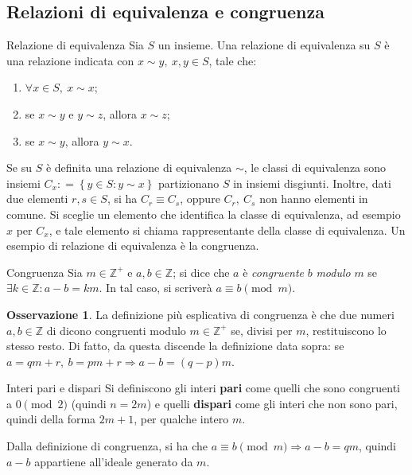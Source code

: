\documentclass[11pt, a4paper]{scrartcl}
\theoremstyle{definition}
\numberwithin{esempio}{section}
\theoremstyle{definition}
\newtheorem{obs}{Osservazione}
\numberwithin{obs}{section}
\numberwithin{nota}{section}
\numberwithin{equation}{subsection}
\begin{document}
\subsection{Relazioni di equivalenza e congruenza}
\begin{definizione}
	{Relazione di equivalenza}{}
	Sia $S$ un insieme.
	Una relazione di equivalenza su $S$ \`e una relazione indicata con $x \sim y, \ x, y \in S$, tale che:
	\begin{enumerate}[ER 1.]
		\item $\forall x \in S, \ x \sim x$;
		\item se $x \sim y$ e $y\sim z$, allora $x \sim z$;
		\item se $x\sim y$, allora $y \sim x$.
	\end{enumerate}
\end{definizione}
\noindent Se su $S$ \`e definita una relazione di equivalenza $\sim$, le classi di equivalenza sono insiemi $C_x : = \left\{ y \in S : y \sim x \right\} $ partizionano $S$ in insiemi disgiunti. 
Inoltre, dati due elementi $r,s \in S$, si ha $C_r \equiv C_s$, oppure $C_r,\ C_s$ non hanno elementi in comune.
Si sceglie un elemento che identifica la classe di equivalenza, ad esempio $x$ per $C_x$, e tale elemento si chiama rappresentante della classe di equivalenza. 
Un esempio di relazione di equivalenza \`e la congruenza.
\begin{definizione}
	{Congruenza}{}
	Sia $m \in \mathbb{Z}^+$ e $a,b \in \mathbb{Z}$; si dice che $a$ \`e \textit{congruente} $b$ \textit{modulo} $m$ se $\exists k \in \mathbb{Z} : a-b = km$. In tal caso, si scriver\`a $a \equiv b  \pmod{m}  $.
\end{definizione}
\begin{obs}
	La definizione pi\`u esplicativa di congruenza \`e che due numeri $a,b \in \mathbb{Z}$ di dicono congruenti modulo $m \in \mathbb{Z}^+$ se, divisi per $m$, restituiscono lo stesso resto.
	Di fatto, da questa discende la definizione data sopra: se $a = qm + r, \ b = pm + r \Rightarrow a - b = (q-p)m$.
\end{obs}
\begin{definizione}
	{Interi pari e dispari}{}
Si definiscono gli interi \textbf{pari} come quelli che sono congruenti a $0 \pmod{2} $ (quindi $n = 2m$) e quelli \textbf{dispari} come gli interi che non sono pari, quindi della forma $2m + 1$, per qualche intero $m$.
\end{definizione}
\noindent Dalla definizione di congruenza, si ha che $a\equiv b \pmod{m}  \Rightarrow  a- b = qm$, quindi $a-b$ appartiene all'ideale generato da $m$.
\end{document}
